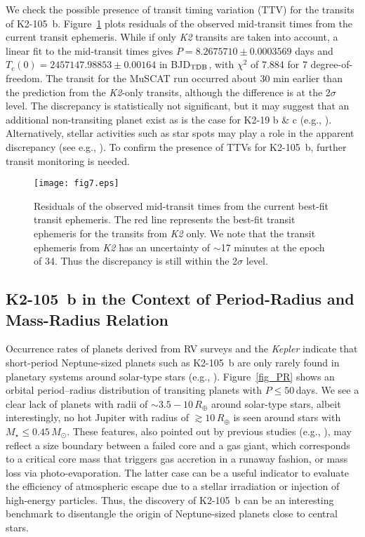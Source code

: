 \documentclass[]{pasj01}
\begin{document}
We check the possible presence of transit timing variation (TTV)
for the transits of K2-105~b.
Figure~\ref{fig_ttv} plots residuals of the observed mid-transit times
from the current transit ephemeris.
While if only {\it K2} transits are taken into account, a linear fit to the mid-transit times
gives $P = 8.2675710 \pm 0.0003569$ days and
$T_c (0) = 2457147.98853 \pm 0.00164$ in BJD$_{\rm TDB}$,
with $\chi^2$ of 7.884 for 7 degree-of-freedom.
The transit for the MuSCAT run
occurred about 30 min earlier than the prediction from the {\it K2}-only transits,
although the difference is at the 2$\sigma$ level.
The discrepancy is statistically not significant, but
it may suggest that an additional non-transiting planet exist as is
the case for K2-19 b \& c (e.g., \cite{2015A&A...582A..33A,2015ApJ...815...47N}).
Alternatively, stellar activities such as star spots may play a role in the apparent discrepancy
(see e.g., \cite{2013A&A...556A..19O}).
To confirm the presence of TTVs for K2-105~b,
further transit monitoring is needed.

	\begin{figure}[tp]
			\texttt{[image: fig7.eps]} 
				\caption{Residuals of the observed mid-transit times from the current best-fit transit ephemeris.
				The red line represents the best-fit transit ephemeris for the transits from {\it K2} only.
				We note that the transit ephemeris from {\it K2} has an uncertainty of $\sim$17 minutes
				at the epoch of 34. Thus the discrepancy is still within the 2$\sigma$ level.
				}
			\label{fig_ttv}
	\end{figure}

\subsection{K2-105~b in the Context of Period-Radius and Mass-Radius Relation}

Occurrence rates of planets derived from RV surveys and
the {\it Kepler} indicate that short-period Neptune-sized planets such as K2-105~b
are only rarely found in planetary systems around solar-type stars
(e.g., \cite{2012ApJS..201...15H,2013PNAS..11019273P}).
Figure~\ref{fig_PR} shows an orbital period--radius distribution of transiting planets with $P \leq 50$\,days. 
We see a clear lack of planets with radii of $\sim 3.5 - 10\,R_\oplus$
around solar-type stars, albeit interestingly, no hot Jupiter with radius of
$\gtrsim 10\,R_\oplus$ is seen around stars with $M_\star \leq 0.45\,M_\odot$.
These features, also pointed out by previous studies
(e.g., \cite{2016A&A...589A..75M,2016ApJ...820L...8M}),
may reflect a size boundary between a failed core and a gas giant,
which corresponds to a critical core mass that triggers gas accretion in a runaway fashion,
or mass loss via photo-evaporation.
The latter case can be a useful indicator to evaluate the efficiency of atmospheric escape
due to a stellar irradiation or injection of high-energy particles.
Thus, the discovery of K2-105~b can be an interesting benchmark
to disentangle the origin of Neptune-sized planets close to central stars.
\end{document}
